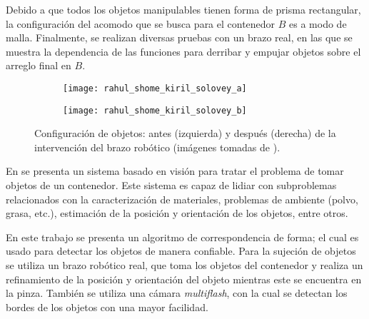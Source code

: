 Debido a que todos los objetos manipulables tienen forma de prisma rectangular, la configuración del acomodo que se busca para el contenedor $B$ es a modo de malla.
Finalmente, se realizan diversas pruebas con un brazo real, en las que se muestra la dependencia de las funciones para derribar y empujar objetos sobre el arreglo final en $B$.
%
\begin{figure}[H]
	\begin{subfigure}{0.45\linewidth}
		\texttt{[image: rahul\_shome\_kiril\_solovey\_a]}%
		\label{subfig:bin_picking_dove_a}%
	\end{subfigure}%
	\hspace{0.5cm}%
	\begin{subfigure}{0.45\linewidth}
		\texttt{[image: rahul\_shome\_kiril\_solovey\_b]}%
		\label{subfig:bin_picking_dove_b}%
	\end{subfigure}%
	\caption{Configuración de objetos: antes (izquierda) y después (derecha) de la intervención del brazo robótico (imágenes tomadas de \cite{8793966}).}%
	\label{fig:8793966}%
\end{figure}
%
En \cite{doi:10.1177/0278364911436018} se presenta un sistema basado en visión para tratar el problema de tomar objetos de un contenedor.
Este sistema es capaz de lidiar con subproblemas relacionados con la caracterización de materiales, problemas de ambiente (polvo, grasa, etc.), estimación de la posición y orientación de los objetos, entre otros.

En este trabajo se presenta un algoritmo de correspondencia de forma; el cual es usado para detectar los objetos de manera confiable.
Para la sujeción de objetos se utiliza un brazo robótico real, que toma los objetos del contenedor y realiza un refinamiento de la posición y orientación del objeto mientras este se encuentra en la pinza.
También se utiliza una cámara \textit{multiflash}, con la cual se detectan los bordes de los objetos con una mayor facilidad.

